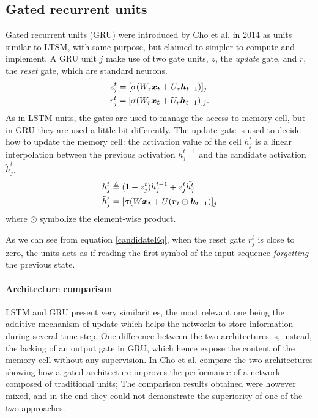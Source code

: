 
\subsection{Gated recurrent units}

Gated recurrent units (GRU) were introduced by Cho et al. in 2014 \cite{gru} as units similar to LTSM, with same purpose, 
but claimed to simpler to compute and implement. A GRU unit $j$ make use of two gate units, $z$, the 
\textit{update} gate, and $r$, the \textit{reset} gate, which are standard neurons.
\begin{align}
 &z_j^t = [\sigma(W_z\boldsymbol{x_t} + U_z\boldsymbol{h}_{t-1})]_j\\
 &r_j^t = [\sigma(W_r\boldsymbol{x_t} + U_r\boldsymbol{h}_{t-1})]_j.\\
\end{align}
As in LSTM units, the gates are used to manage the access to memory cell, but in GRU they are used a little bit 
differently. The update gate is used to decide how to update the memory cell: the activation value of the cell 
$h_j^{t}$ is a linear interpolation between the previous activation $h_j^{t-1}$ and the candidate activation 
$\tilde{h}_j^t$.
\begin{align}
 &h_j^t \triangleq (1-z_j^t)h_j^{t-1} + z_j^t\tilde{h^t_j}\\
  \label{candidateEq}
 &\tilde{h}_j^t = [\sigma(W\boldsymbol{x_t} + U(\boldsymbol{r}_t \odot \boldsymbol{h}_{t-1})]_j
\end{align}
where $\odot$ symbolize the element-wise product.

As we can see from equation \ref{candidateEq}, when the reset gate $r_j^t$ is close to zero, the units acts as if 
reading the first symbol of the input sequence \textit{forgetting} the previous state.

\paragraph{Architecture comparison}
LSTM and GRU present very similarities, the most relevant one being the additive mechanism of update which helps the 
networks to store information during several time step. One difference between the two architectures is, instead, the 
lacking of an output gate in GRU, which hence expose the content of the memory cell without any supervision. In 
\cite{gru_lstm_empirical} Cho et al. compare the two architectures showing how a gated architecture improves the 
performance of a network composed of traditional units; The comparison results obtained were however mixed, and in the 
end they could not demonstrate the superiority of one of the two approaches.

